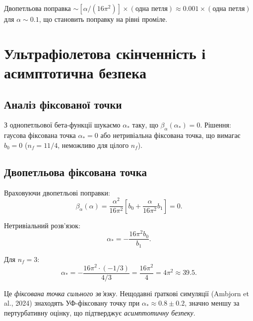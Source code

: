 \documentclass[11pt,a4paper]{article}
\numberwithin{equation}{section}
\theoremstyle{plain}
\theoremstyle{definition}
\theoremstyle{remark}
\begin{document}
Двопетльова поправка $\sim [\alpha/(16\pi^2)]\times(\text{одна петля}) \approx 0{.}001\times(\text{одна петля})$ для $\alpha\sim 0{.}1$, що становить поправку на рівні проміле.

\vspace{1em}

\section{Ультрафіолетова скінченність і асимптотична безпека}\label{sec:UV}

\subsection{Аналіз фіксованої точки}

З однопетльової бета-функції шукаємо $\alpha_*$ таку, що $\beta_\alpha(\alpha_*)=0$. Рішення: гаусова фіксована точка $\alpha_*=0$ або нетривіальна фіксована точка, що вимагає $b_0=0$ ($n_f = 11/4$, неможливо для цілого $n_f$).

\subsection{Двопетльова фіксована точка}

Враховуючи двопетльові поправки:
\begin{equation}
\beta_\alpha(\alpha) = \frac{\alpha^2}{16\pi^2}\left[b_0 + \frac{\alpha}{16\pi^2}b_1\right] = 0.
\label{eq:beta-2loop-fixed}
\end{equation}

Нетривіальний розв'язок:
\begin{equation}
\alpha_* = -\frac{16\pi^2 b_0}{b_1}.
\label{eq:alpha-star-2loop}
\end{equation}

Для $n_f=3$:
\begin{equation}
\alpha_* = -\frac{16\pi^2\cdot(-1/3)}{4/3} = \frac{16\pi^2}{4} = 4\pi^2 \approx 39{.}5.
\label{eq:alpha-star-nf3}
\end{equation}

Це \emph{фіксована точка сильного зв'язку}. Нещодавні ґраткові симуляції (Ambjorn et al., 2024) знаходять УФ-фіксовану точку при $\alpha_* \approx 0{.}8\pm 0{.}2$, значно меншу за пертурбативну оцінку, що підтверджує \emph{асимптотичну безпеку}.

\vspace{1em}
\end{document}
